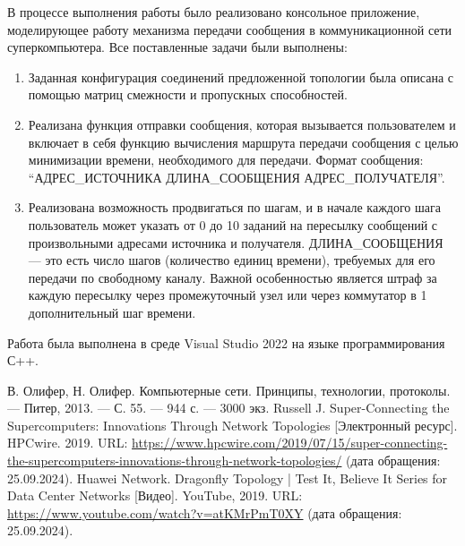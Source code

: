 \documentclass[11pt,a4paper,final]{article} %
\begin{document}
В процессе выполнения работы было реализовано консольное приложение, моделирующее работу механизма передачи сообщения в коммуникационной сети суперкомпьютера. Все поставленные задачи были выполнены: 
\begin{enumerate}
	\item Заданная конфигурация соединений предложенной топологии была описана с помощью матриц смежности и пропускных способностей. 
	\item Реализана функция отправки сообщения, которая вызывается пользователем и включает в себя функцию вычисления маршрута передачи сообщения с целью минимизации времени, необходимого для передачи. Формат сообщения: ``АДРЕС\_ИСТОЧНИКА ДЛИНА\_СООБЩЕНИЯ АДРЕС\_ПОЛУЧАТЕЛЯ''.
	\item Реализована возможность продвигаться по шагам, и в начале каждого шага пользователь может указать от 0 до 10 заданий на пересылку сообщений с произвольными адресами источника и получателя. ДЛИНА\_СООБЩЕНИЯ — это есть число шагов (количество единиц времени), требуемых для его передачи по свободному каналу.
	Важной особенностью является штраф за каждую пересылку через промежуточный узел или через коммутатор в 1 дополнительный шаг времени.
\end{enumerate}

\par Работа была выполнена в среде Visual Studio 2022 на языке программирования С++.	

\newpage
{}

\begin{thebibliography}{99}
	 В. Олифер, Н. Олифер. Компьютерные сети. Принципы, технологии, протоколы. — Питер, 2013. — С. 55. — 944 с. — 3000 экз.
	 Russell J. Super-Connecting the Supercomputers: Innovations Through Network Topologies [Электронный ресурс]. HPCwire. 2019. URL: \url{https://www.hpcwire.com/2019/07/15/super-connecting-the-supercomputers-innovations-through-network-topologies/} (дата обращения: 25.09.2024).
	Huawei Network. Dragonfly Topology | Test It, Believe It Series for Data Center Networks [Видео]. YouTube, 2019. URL: \url{https://www.youtube.com/watch?v=atKMrPmT0XY} (дата обращения: 25.09.2024).
\end{thebibliography}

		
\end{document}
